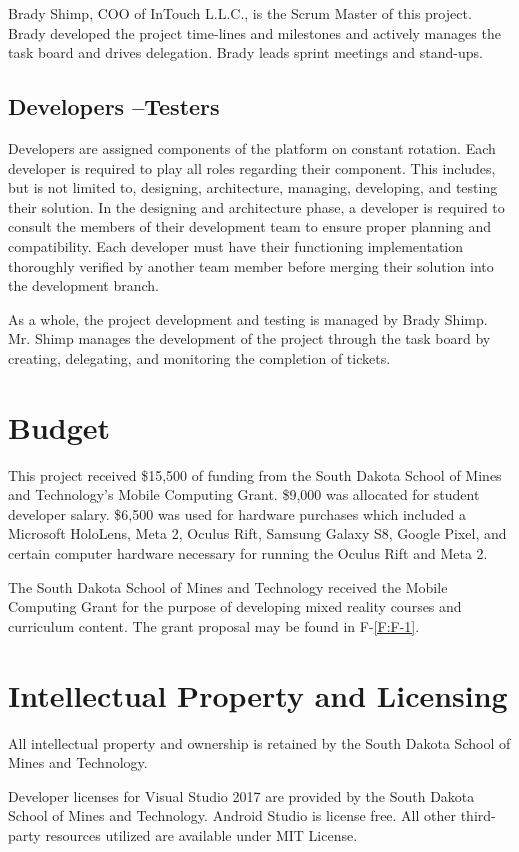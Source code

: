 Brady Shimp, COO of InTouch L.L.C., is the Scrum Master of this project. Brady developed the project time-lines and milestones and actively manages the task board and drives delegation. Brady leads sprint meetings and stand-ups. 

\subsection{Developers --Testers}

Developers are assigned components of the platform on constant rotation. Each developer is required to play all roles regarding their component. This includes, but is not limited to, designing, architecture, managing, developing, and testing their solution. In the designing and architecture phase, a developer is required to consult the members of their development team to ensure proper planning and compatibility. Each developer must have their functioning implementation thoroughly verified by another team member before merging their solution into the development branch. 

As a whole, the project development and testing is managed by Brady Shimp. Mr. Shimp manages the development of the project through the task board by creating, delegating, and monitoring the completion of tickets. 

\section{Budget}

This project received \$15,500 of funding from the South Dakota School of Mines and Technology's Mobile Computing Grant. \$9,000 was allocated for student developer salary. \$6,500 was used for hardware purchases which included a Microsoft HoloLens, Meta 2, Oculus Rift, Samsung Galaxy S8, Google Pixel, and certain computer hardware necessary for running the Oculus Rift and Meta 2. 
 
The South Dakota School of Mines and Technology received the Mobile Computing Grant for the purpose of developing mixed reality courses and curriculum content. The grant proposal may be found in F-\ref{F:F-1}.

\section{Intellectual Property and Licensing}

All intellectual property and ownership is retained by the South Dakota School of Mines and Technology.

Developer licenses for Visual Studio 2017 are provided by the South Dakota School of Mines and Technology. Android Studio is license free. All other third-party resources utilized are available under MIT License. 

